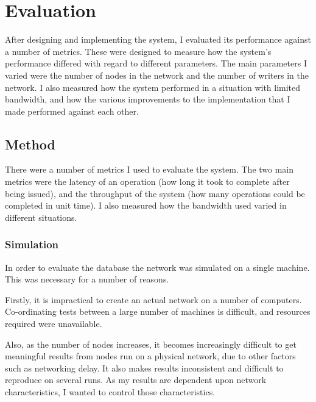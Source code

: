 \documentclass[12pt,twoside,notitlepage]{report}
\begin{document}
%
%
%

\cleardoublepage
\chapter{Evaluation}

After designing and implementing the system, I evaluated its performance against a number of
metrics. These were designed to measure how the system's performance differed with regard to
different parameters. The main parameters I varied were the number of nodes in the network and the
number of writers in the network. I also measured how the system performed in a situation with
limited bandwidth, and how the various improvements to the implementation that I made performed
against each other.

\section{Method}

There were a number of metrics I used to evaluate the system. The two main metrics were the
latency of an operation (how long it took to complete after being issued), and the throughput of
the system (how many operations could be completed in unit time). I also measured how the
bandwidth used varied in different situations.

\subsection{Simulation}

In order to evaluate the database the network was simulated on a single machine. This was necessary
for a number of reasons.

Firstly, it is impractical to create an actual network on a number of computers. Co-ordinating
tests between a large number of machines is difficult, and resources required were unavailable.

Also, as the number of nodes increases, it becomes increasingly difficult to get meaningful
results from nodes run on a physical network, due to other factors such as networking delay. It
also makes results inconsistent and difficult to reproduce on several runs. As my results are
dependent upon network characteristics, I wanted to control those characteristics.
\end{document}
